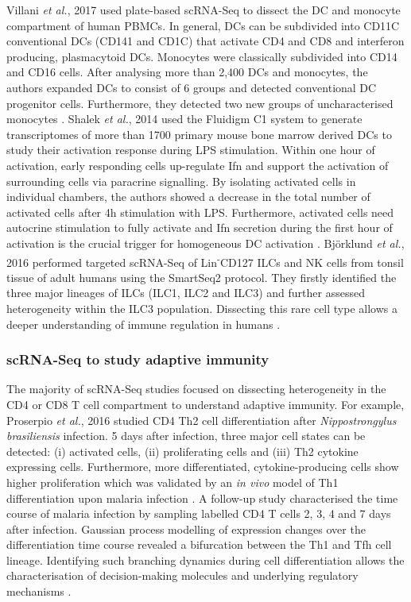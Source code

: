 Villani \emph{et al.}, 2017 used plate-based scRNA-Seq to dissect the \gls{DC} and monocyte compartment of human \glspl{PBMC}. 
In general, DCs can be subdivided into CD11C\plus{} conventional DCs (CD141\plus{} and CD1C\plus{}) that activate CD4\plus{} and CD8\plus{} and interferon producing, plasmacytoid DCs. 
Monocytes were classically subdivided into CD14\plus{} and CD16\plus{} cells. 
After analysing more than 2,400 DCs and monocytes, the authors expanded DCs to consist of 6 groups and detected conventional DC progenitor cells. 
Furthermore, they detected two new groups of uncharacterised monocytes \citep{Villani2017}. 
Shalek \emph{et al.}, 2014 used the Fluidigm C1 system to generate transcriptomes of more than 1700 primary mouse bone marrow derived DCs to study their activation response during \gls{LPS} stimulation. 
Within one hour of activation, early responding cells up-regulate \gls{Ifn}\textbeta{} and support the activation of surrounding cells via paracrine signalling. 
By isolating activated cells in individual chambers, the authors showed a decrease in the total number of activated cells after 4h stimulation with LPS. 
Furthermore, activated cells need autocrine stimulation to fully activate and Ifn\textbeta{} secretion during the first hour of activation is the crucial trigger for homogeneous DC activation \citep{Shalek2014}. 
Bj\"o{}rklund \emph{et al.}, 2016 performed targeted scRNA-Seq of Lin\textsuperscript{-}CD127\plus{} \glspl{ILC} and NK cells from tonsil tissue of adult humans using the SmartSeq2 protocol. 
They firstly identified the three major lineages of ILCs (ILC1, ILC2 and ILC3) and further assessed heterogeneity within the ILC3 population. 
Dissecting this rare cell type allows a deeper understanding of immune regulation in humans \citep{Bjorklund2016}. 

\subsubsection{scRNA-Seq to study adaptive immunity}

The majority of scRNA-Seq studies focused on dissecting heterogeneity in the CD4\plus{} or CD8\plus{} T cell compartment to understand adaptive immunity. 
For example, Proserpio \emph{et al.}, 2016 studied CD4\plus{} Th2 cell differentiation after \textit{Nippostrongylus brasiliensis} infection. 
5 days after infection, three major cell states can be detected: (i) activated cells, (ii) proliferating cells and (iii) Th2 cytokine expressing cells. 
Furthermore, more differentiated, cytokine-producing cells show higher proliferation which was validated by an \emph{in vivo} model of Th1 differentiation upon malaria infection \citep{Proserpio2016}. 
A follow-up study characterised the time course of malaria infection by sampling labelled CD4\plus{} T cells 2, 3, 4 and 7 days after infection. Gaussian process modelling of expression changes over the differentiation time course revealed a bifurcation between the Th1 and \gls{Tfh} cell lineage. 
Identifying such branching dynamics during cell differentiation allows the characterisation of decision-making molecules and underlying regulatory mechanisms \citep{Lonnberg2017}. \\


